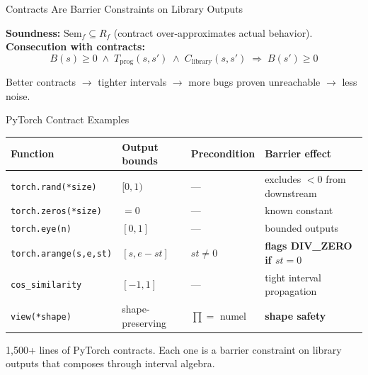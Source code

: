 \documentclass[aspectratio=169]{beamer}
\begin{document}
\begin{frame}{Contracts Are Barrier Constraints on Library Outputs}
\begin{center}
\end{center}

\vspace{0.8em}
\textbf{Soundness:} $\text{Sem}_f \subseteq R_f$ (contract over-approximates actual behavior).\\[3pt]
\textbf{Consecution with contracts:}
\[
B(s) \ge 0 \;\wedge\; T_{\text{prog}}(s,s') \;\wedge\; C_{\text{library}}(s,s') \;\Rightarrow\; B(s') \ge 0
\]

\vspace{0.3em}
Better contracts $\to$ tighter intervals $\to$ more bugs proven unreachable $\to$ less noise.
\end{frame}

\begin{frame}{PyTorch Contract Examples}
\begin{center}
\renewcommand{\arraystretch}{1.3}
\begin{tabular}{llll}
\toprule
\textbf{Function} & \textbf{Output bounds} & \textbf{Precondition} & \textbf{Barrier effect} \\
\midrule
\texttt{torch.rand(*size)} & $[0, 1)$ & --- & excludes $<0$ from downstream \\
\texttt{torch.zeros(*size)} & $= 0$ & --- & known constant \\
\texttt{torch.eye(n)} & $[0, 1]$ & --- & bounded outputs \\
\texttt{torch.arange(s,e,st)} & $[s, e{-}st]$ & $st \neq 0$ & \textbf{flags DIV\_ZERO if $st=0$} \\
\texttt{cos\_similarity} & $[-1, 1]$ & --- & tight interval propagation \\
\texttt{view(*shape)} & shape-preserving & $\prod = $ numel & \textbf{shape safety} \\
\bottomrule
\end{tabular}
\end{center}

\vspace{0.5em}
1{,}500+ lines of PyTorch contracts. Each one is a barrier constraint on library outputs that composes through interval algebra.
\end{frame}
\end{document}
